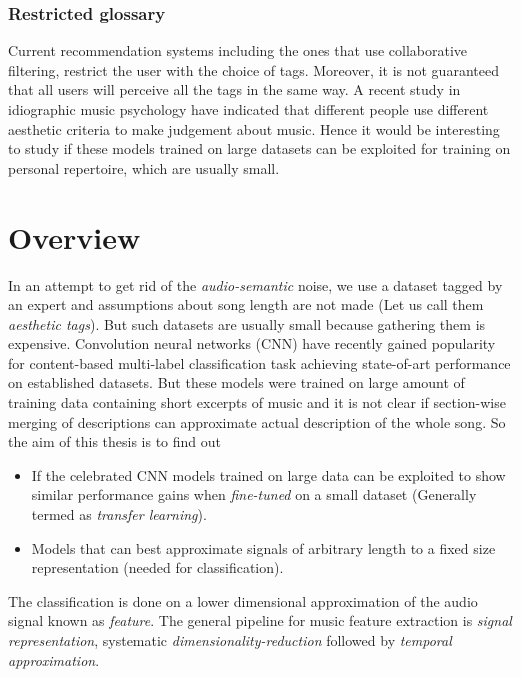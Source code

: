 \subsubsection{Restricted glossary}
Current recommendation systems including the ones that use collaborative filtering, restrict the user with the choice of tags. Moreover, it is not guaranteed that all users will perceive all the tags in the same way. A recent study in idiographic music psychology have indicated that different people use different aesthetic criteria to make judgement about music\cite{NoAccountingForTaste}. Hence it would be interesting to study if these models \cite{choi_cnn}\cite{choi_crnn} trained on large datasets can be exploited for training on personal repertoire, which are usually small.  



\section{Overview}
\label{overview}
In an attempt to get rid of the \textit{audio-semantic} noise, we use a dataset tagged by an expert and assumptions about song length are not made (Let us call them \textit{aesthetic tags}). But such datasets are usually small because gathering them is expensive. Convolution neural networks (CNN) have recently gained popularity for content-based multi-label classification task achieving state-of-art performance\cite{choi_cnn}\cite{choi_crnn} on established datasets\cite{MSD}\cite{MTT}. But these models were trained on large amount of training data containing short excerpts of music and it is not clear if section-wise merging of descriptions can approximate actual description of the whole song. So the aim of this thesis is to find out
\begin{itemize}
\setlength\itemsep{0em}
\item If the celebrated CNN models trained on large data can be exploited to show similar performance gains when \textit{fine-tuned} on a small dataset (Generally termed as \textit{transfer learning}).
\item Models that can best approximate signals of arbitrary length to a fixed size representation (needed for classification).
\end{itemize} 
    
\noindent The classification is done on a lower dimensional approximation of the audio signal known as \textit{feature}. The general pipeline for music feature extraction is \textit{signal representation}, systematic \textit{dimensionality-reduction} followed by \textit{temporal approximation}.
  
